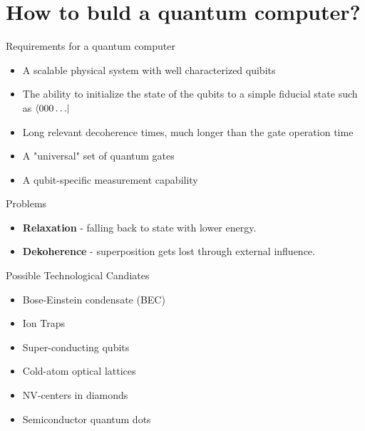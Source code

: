 %
%

\section{How to buld a quantum computer?}


\begin{frame}{Requirements for a quantum computer}
 \begin{itemize}
   \item A scalable physical system with well characterized quibits
    \item The ability to initialize the state of the qubits to a simple fiducial state such as $\bra{000\dots}$
    \item Long relevant decoherence times, much longer than the gate operation time
    \item A "universal" set of quantum gates
    \item A qubit-specific measurement capability
 
 \end{itemize}
\end{frame}

\begin{frame}{Problems}

 \begin{itemize}
 
  \item \textbf{Relaxation} - falling back to state with lower energy.
  
  \item \textbf{Dekoherence} - superposition gets lost through external influence.
 
 \end{itemize}


\end{frame}

\begin{frame}{Possible Technological Candiates}
 \begin{itemize}
  \item Bose-Einstein condensate (BEC)
  \item Ion Traps
  \item Super-conducting qubits
  \item Cold-atom optical lattices
  \item NV-centers in diamonds
  \item Semiconductor quantum dots
 \end{itemize}

\end{frame}

